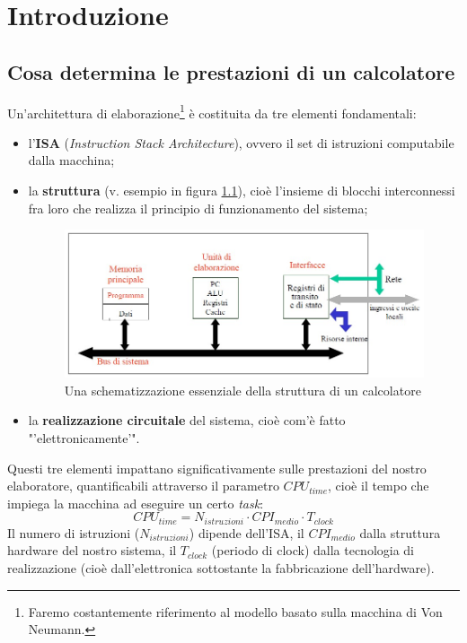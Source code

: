 \chapter{Introduzione}
\label{cha:Introduzione}

\section{Cosa determina le prestazioni di un calcolatore}
\label{sec:cosaDeterminaPrestazioni}

Un'architettura di elaborazione\footnote{Faremo costantemente riferimento al modello basato sulla macchina di Von Neumann.} è costituita da tre elementi fondamentali:
\begin{itemize}
\item l'\textbf{ISA} (\textit{Instruction Stack Architecture}), ovvero il set di istruzioni computabile dalla macchina;
\item la \textbf{struttura} (v. esempio in figura \ref{fig:strutturaSchematica}), cioè l'insieme di blocchi interconnessi fra loro che realizza il principio di funzionamento del sistema;
\begin{figure}[!h]
\centering
\includegraphics[width=0.8\columnwidth]{img/strutturaSchematica}
\caption{Una schematizzazione essenziale della struttura di un calcolatore}
\label{fig:strutturaSchematica}
\end{figure}
\item la \textbf{realizzazione circuitale} del sistema, cioè com'è fatto "'elettronicamente'".
\end{itemize}

Questi tre elementi impattano significativamente sulle prestazioni del nostro elaboratore, quantificabili attraverso il parametro $CPU_{time}$, cioè il tempo che impiega la macchina ad eseguire un certo \textit{task}:
\[
CPU_{time} = N_{istruzioni} \cdot CPI_{medio} \cdot T_{clock}
\]
Il numero di istruzioni ($N_{istruzioni}$) dipende dell'ISA, il $CPI_{medio}$ dalla struttura hardware del nostro sistema, il $T_{clock}$ (periodo di clock) dalla tecnologia di realizzazione (cioè dall'elettronica sottostante la fabbricazione dell'hardware).

